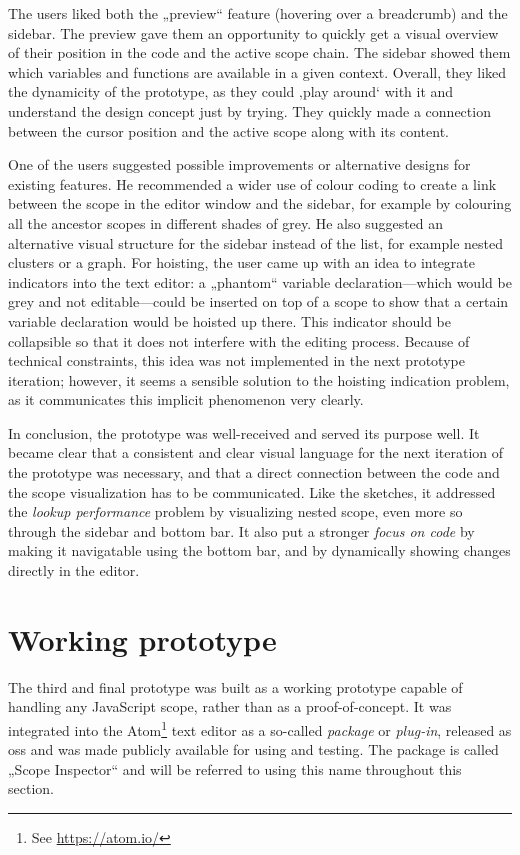 The users liked both the „preview“ feature (hovering over a breadcrumb)
and the sidebar. The preview gave them an opportunity to quickly get a
visual overview of their position in the code and the active scope
chain. The sidebar showed them which variables and functions are
available in a given context. Overall, they liked the dynamicity of the
prototype, as they could ‚play around‘ with it and understand the design
concept just by trying. They quickly made a connection between the
cursor position and the active scope along with its content.

One of the users suggested possible improvements or alternative designs
for existing features. He recommended a wider use of colour coding to
create a link between the scope in the editor window and the sidebar,
for example by colouring all the ancestor scopes in different shades of
grey. He also suggested an alternative visual structure for the sidebar
instead of the list, for example nested clusters or a graph. For
hoisting, the user came up with an idea to integrate indicators into the
text editor: a „phantom“ variable declaration—which would be grey and
not editable—could be inserted on top of a scope to show that a certain
variable declaration would be hoisted up there. This indicator should be
collapsible so that it does not interfere with the editing process.
Because of technical constraints, this idea was not implemented in the
next prototype iteration; however, it seems a sensible solution to the
hoisting indication problem, as it communicates this implicit phenomenon
very clearly.

In conclusion, the prototype was well-received and served its purpose
well. It became clear that a consistent and clear visual language for
the next iteration of the prototype was necessary, and that a direct
connection between the code and the scope visualization has to be
communicated. Like the sketches, it addressed the \emph{lookup
performance} problem by visualizing nested scope, even more so through
the sidebar and bottom bar. It also put a stronger \emph{focus on code}
by making it navigatable using the bottom bar, and by dynamically
showing changes directly in the editor.

\section{Working prototype}\label{working-prototype}

The third and final prototype was built as a working prototype capable
of handling any JavaScript scope, rather than as a proof-of-concept. It
was integrated into the Atom\footnote{See \url{https://atom.io/}} text
editor as a so-called \emph{package} or \emph{plug-in}, released as
\gls{oss} and was made publicly available for using and testing. The
package is called „Scope Inspector“ and will be referred to using this
name throughout this section.

